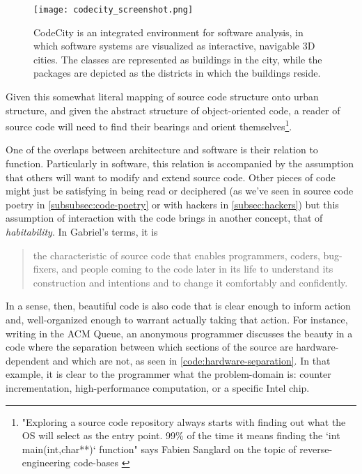 \begin{figure}
    \texttt{[image: codecity\_screenshot.png]}
    \caption{CodeCity is an integrated environment for software analysis, in which software systems are visualized as interactive, navigable 3D cities. The classes are represented as buildings in the city, while the packages are depicted as the districts in which the buildings reside. \citep{wettel_codecity_2008}}
    \label{graphic:code-city}
\end{figure}

Given this somewhat literal mapping of source code structure onto urban structure, and given the abstract structure of object-oriented code, a reader of source code will need to find their bearings and orient themselves\footnote{"Exploring a source code repository always starts with finding out what the OS will select as  the entry point. 99\% of the time it means finding the `int main(int,char**)` function" says Fabien Sanglard on the topic of reverse-engineering code-bases \citep{sanglard_game_2018}}.

One of the overlaps between architecture and software is their relation to function. Particularly in software, this relation is accompanied by the assumption that others will want to modify and extend source code. Other pieces of code might just be satisfying in being read or deciphered (as we've seen in source code poetry in \ref{subsubsec:code-poetry} or with hackers in \ref{subsec:hackers}) but this assumption of interaction with the code brings in another concept, that of \emph{habitability}. In Gabriel's terms, it is

\begin{quote}
    the characteristic of source code that enables programmers, coders, bug-fixers, and people coming to the code later in its life to understand its construction and intentions and to change it comfortably and confidently. \citep{gabriel_patterns_1998}
\end{quote}

In a sense, then, beautiful code is also code that is clear enough to inform action and, well-organized enough to warrant actually taking that action. For instance, writing in the ACM Queue, an anonymous programmer discusses the beauty in a code where the separation between which sections of the source are hardware-dependent and which are not, as seen in \ref{code:hardware-separation}. In that example, it is clear to the programmer what the problem-domain is: counter incrementation, high-performance computation, or a specific Intel chip.

